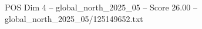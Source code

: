 \begin{textsample}{POS Dim 4 – global\_north\_2025\_05 – Score 26.00 – global\_north\_2025\_05/125149652.txt}
\end{textsample}
